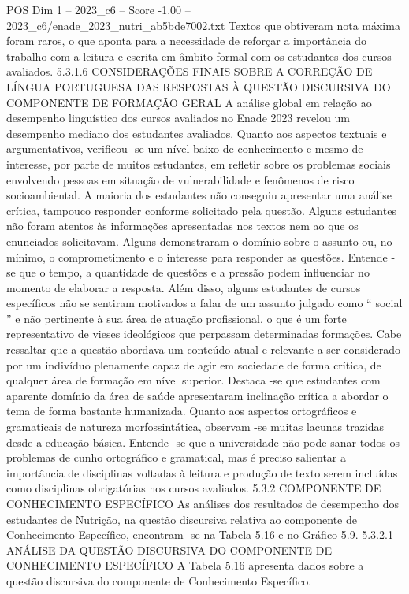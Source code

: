 \begin{textsample}{POS Dim 1 – 2023\_c6 – Score -1.00 – 2023\_c6/enade\_2023\_nutri\_ab5bde7002.txt}
Textos que obtiveram nota máxima foram raros, o que aponta para a necessidade de reforçar a importância do trabalho com a leitura e escrita em âmbito formal com os estudantes dos cursos avaliados. 5.3.1.6 CONSIDERAÇÕES FINAIS SOBRE A CORREÇÃO DE LÍNGUA PORTUGUESA DAS RESPOSTAS À QUESTÃO DISCURSIVA DO COMPONENTE DE FORMAÇÃO GERAL A análise global em relação ao desempenho linguístico dos cursos avaliados no Enade 2023 revelou um desempenho mediano dos estudantes avaliados.
Quanto aos aspectos textuais e argumentativos, verificou -se um nível baixo de conhecimento e mesmo de interesse, por parte de muitos estudantes, em refletir sobre os problemas sociais envolvendo pessoas em situação de vulnerabilidade e fenômenos de risco socioambiental.
A maioria dos estudantes não conseguiu apresentar uma análise crítica, tampouco responder conforme solicitado pela questão.
Alguns estudantes não foram atentos às informações apresentadas nos textos nem ao que os enunciados solicitavam.
Alguns demonstraram o domínio sobre o assunto ou, no mínimo, o comprometimento e o interesse para responder as questões.
Entende -se que o tempo, a quantidade de questões e a pressão podem influenciar no momento de elaborar a resposta.
Além disso, alguns estudantes de cursos específicos não se sentiram motivados a falar de um assunto julgado como “ social ” e não pertinente à sua área de atuação profissional, o que é um forte representativo de vieses ideológicos que perpassam determinadas formações.
Cabe ressaltar que a questão abordava um conteúdo atual e relevante a ser considerado por um indivíduo plenamente capaz de agir em sociedade de forma crítica, de qualquer área de formação em nível superior.
Destaca -se que estudantes com aparente domínio da área de saúde apresentaram inclinação crítica a abordar o tema de forma bastante humanizada.
Quanto aos aspectos ortográficos e gramaticais de natureza morfossintática, observam -se muitas lacunas trazidas desde a educação básica.
Entende -se que a universidade não pode sanar todos os problemas de cunho ortográfico e gramatical, mas é preciso salientar a importância de disciplinas voltadas à leitura e produção de texto serem incluídas como disciplinas obrigatórias nos cursos avaliados. 5.3.2 COMPONENTE DE CONHECIMENTO ESPECÍFICO As análises dos resultados de desempenho dos estudantes de Nutrição, na questão discursiva relativa ao componente de Conhecimento Específico, encontram -se na Tabela 5.16 e no Gráfico 5.9. 5.3.2.1 ANÁLISE DA QUESTÃO DISCURSIVA DO COMPONENTE DE CONHECIMENTO ESPECÍFICO A Tabela 5.16 apresenta dados sobre a questão discursiva do componente de Conhecimento Específico.

\end{textsample}
